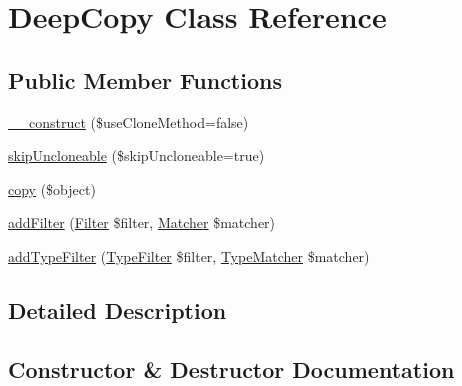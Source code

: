 \hypertarget{class_deep_copy_1_1_deep_copy}{}\section{Deep\+Copy Class Reference}
\label{class_deep_copy_1_1_deep_copy}
\subsection*{Public Member Functions}
\begin{DoxyCompactItemize}
\item 
\mbox{\hyperlink{class_deep_copy_1_1_deep_copy_ac4e821547796a7f00ba76c9030159529}{\+\_\+\+\_\+construct}} (\$use\+Clone\+Method=false)
\item 
\mbox{\hyperlink{class_deep_copy_1_1_deep_copy_a76680d861cd7d4c7604672146b101cbf}{skip\+Uncloneable}} (\$skip\+Uncloneable=true)
\item 
\mbox{\hyperlink{class_deep_copy_1_1_deep_copy_a07abdb9b8e783676fd376c8877ada3dc}{copy}} (\$object)
\item 
\mbox{\hyperlink{class_deep_copy_1_1_deep_copy_ac0fe38a45487319202e8528ecc7bb868}{add\+Filter}} (\mbox{\hyperlink{interface_deep_copy_1_1_filter_1_1_filter}{Filter}} \$filter, \mbox{\hyperlink{interface_deep_copy_1_1_matcher_1_1_matcher}{Matcher}} \$matcher)
\item 
\mbox{\hyperlink{class_deep_copy_1_1_deep_copy_a110cd15e70339241896eddb1f359967f}{add\+Type\+Filter}} (\mbox{\hyperlink{interface_deep_copy_1_1_type_filter_1_1_type_filter}{Type\+Filter}} \$filter, \mbox{\hyperlink{class_deep_copy_1_1_type_matcher_1_1_type_matcher}{Type\+Matcher}} \$matcher)
\end{DoxyCompactItemize}


\subsection{Detailed Description}


\subsection{Constructor \& Destructor Documentation}
\mbox{\label{class_deep_copy_1_1_deep_copy_ac4e821547796a7f00ba76c9030159529}} 
